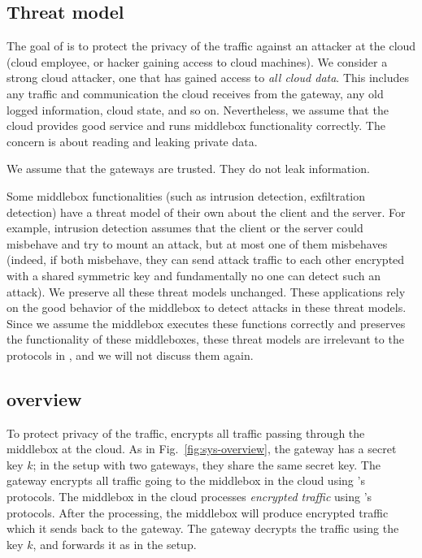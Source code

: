 \subsection{Threat model}

The goal of \sys is to protect the privacy of the traffic against an attacker at the cloud 
(cloud employee, or hacker gaining access to cloud machines). 
We consider a strong cloud attacker, one that has gained access to {\em all cloud data}.
This includes any traffic and communication the cloud receives from the 
gateway, any old logged information, cloud state, and so on. Nevertheless, we assume that 
the cloud provides good service and runs middlebox functionality correctly.  The concern is
about reading and leaking private data. 

We assume that the gateways are trusted. They do not leak information.


Some middlebox functionalities (such as intrusion detection, exfiltration detection) have a threat model
of their own about the client and the server. For example, intrusion detection assumes that 
the client or the server could misbehave and try to mount an attack, but at most one of them misbehaves 
(indeed, if both misbehave, they can send attack traffic to each other encrypted with a shared symmetric key and fundamentally
no one can detect such an attack).  We preserve all these threat models unchanged. These applications rely
on the good behavior of the middlebox to detect attacks in these threat models. Since we assume the middlebox executes
these functions correctly and \sys preserves the functionality of these middleboxes, 
these threat models are irrelevant to the protocols in \sys, and we will not discuss them again. 



\subsection{\sys overview}


To protect privacy of the traffic, \sys encrypts all traffic passing through the middlebox at the cloud. 
As in Fig.~\ref{fig:sys-overview}, the gateway has a secret key $k$; in the setup with two gateways, they share
the same secret key. The gateway encrypts all traffic going to the middlebox in the cloud using \sys's protocols.
The middlebox in the cloud processes {\em encrypted traffic} using \sys's protocols. 
After the processing, the middlebox
will produce encrypted traffic which it sends back to the gateway. The gateway decrypts the traffic using the key $k$, 
and forwards it as in the setup.

